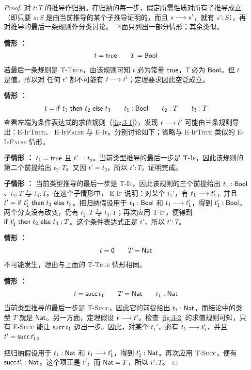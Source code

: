 \begin{proof}
对 \(t:T\) 的推导作归纳。在归纳的每一步，假定所需性质对所有子推导成立
（即只要 \(s:S\) 是由当前推导的某个子推导证明的，而且
\(s\mathrel{\longrightarrow} s'\)，就有 \(s':S\)），再对推导的最后一条规则作分类讨论。
下面只列出一部分情形；其余类似。

\medskip\noindent
\textbf{情形 ：}
\[
t=\mathsf{true}\qquad T=\mathsf{Bool}
\]
若最后一条规则是 \textsc{T-True}，由该规则可知 \(t\) 必为常量
\(\mathsf{true}\)，\(T\) 必为 \(\mathsf{Bool}\)。但 \(t\) 是值，所以对
任何 \(t'\) 都不可能有 \(t\mathrel{\longrightarrow} t'\)；定理要求因此空泛成立。

\medskip\noindent
\textbf{情形 ：}
\[
t=\mathsf{if}\ t_1\ \mathsf{then}\ t_2\ \mathsf{else}\ t_3
\qquad t_1:\mathsf{Bool}\qquad t_2:T\qquad t_3:T
\]
查看左端为条件表达式的求值规则（\cref{fig:3-1}），发现
\(t\mathrel{\longrightarrow} t'\) 可能由三条规则导出：\textsc{E-IfTrue}、
\textsc{E-IfFalse} 与 \textsc{E-If}。分别讨论如下；省略与
\textsc{E-IfTrue} 类似的 \textsc{E-IfFalse} 情形。

\smallskip\noindent
\textbf{子情形 ：}
\(t_1=\mathsf{true}\) 且 \(t'=t_2\)。当前类型推导的最后一步是
\textsc{T-If}，因此该规则的第二个前提给出 \(t_2:T\)。又因
\(t'=t_2\)，所以 \(t':T\)，证明完成。

\smallskip\noindent
\textbf{子情形 ：}
当前类型推导的最后一步是 \textsc{T-If}，因此该规则的三个前提给出
\(t_1:\mathsf{Bool}\)、\(t_2:T\) 与 \(t_3:T\)。在这个子情形中，
\textsc{E-If} 说明：对某个 \(t_1'\)，有 \(t_1\mathrel{\longrightarrow} t_1'\)，并且
\(t'=\mathsf{if}\ t_1'\ \mathsf{then}\ t_2\ \mathsf{else}\ t_3\)。把归纳假设用于
\(t_1:\mathsf{Bool}\) 和 \(t_1\mathrel{\longrightarrow} t_1'\)，得到
\(t_1':\mathsf{Bool}\)。两个分支没有改变，仍有 \(t_2:T\) 与
\(t_3:T\)；再次应用 \textsc{T-If}，便得到
\(\mathsf{if}\ t_1'\ \mathsf{then}\ t_2\ \mathsf{else}\ t_3:T\)。这个条件表达式正是 \(t'\)，所以
\(t':T\)。

\medskip\noindent
\textbf{情形 ：}
\[
t=\mathsf{0}\qquad T=\mathsf{Nat}
\]
不可能发生，理由与上面的 \textsc{T-True} 情形相同。

\medskip\noindent
\textbf{情形 ：}
\[
t=\mathsf{succ}\,t_1\qquad T=\mathsf{Nat}\qquad
t_1:\mathsf{Nat}
\]
当前类型推导的最后一步是 \textsc{T-Succ}，因此它的前提给出
\(t_1:\mathsf{Nat}\)，而结论中的类型 \(T\) 就是
\(\mathsf{Nat}\)。另一方面，定理假设 \(t\mathrel{\longrightarrow} t'\)。检查
\cref{fig:3-2} 的求值规则可知，只有 \textsc{E-Succ} 能让
\(\mathsf{succ}\,t_1\) 迈出一步。因此，对某个 \(t_1'\)，必有
\(t_1\mathrel{\longrightarrow} t_1'\)，并且 \(t'=\mathsf{succ}\,t_1'\)。

把归纳假设用于 \(t_1:\mathsf{Nat}\) 和 \(t_1\mathrel{\longrightarrow} t_1'\)，得到
\(t_1':\mathsf{Nat}\)。再次应用 \textsc{T-Succ}，便有
\(\mathsf{succ}\,t_1':\mathsf{Nat}\)。这个项正是 \(t'\)，而
\(\mathsf{Nat}=T\)，所以 \(t':T\)。
\end{proof}

